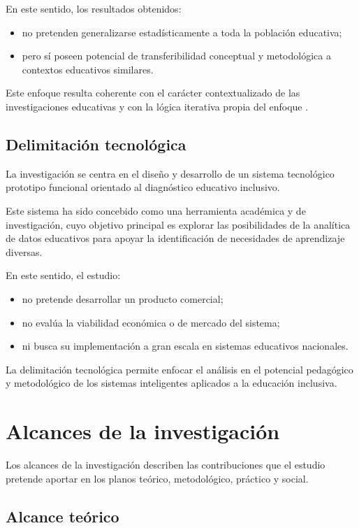 \begin{refsection}
En este sentido, los resultados obtenidos:

\begin{itemize}
\item no pretenden generalizarse estadísticamente a toda la población educativa;
\item pero sí poseen potencial de transferibilidad conceptual y metodológica a contextos educativos similares.
\end{itemize}

Este enfoque resulta coherente con el carácter contextualizado de las investigaciones educativas y con la lógica iterativa propia del enfoque \DBR.

\subsection{Delimitación tecnológica}

La investigación se centra en el diseño y desarrollo de un sistema tecnológico prototipo funcional orientado al diagnóstico educativo inclusivo.

Este sistema ha sido concebido como una herramienta académica y de investigación, cuyo objetivo principal es explorar las posibilidades de la analítica de datos educativos para apoyar la identificación de necesidades de aprendizaje diversas.

En este sentido, el estudio:

\begin{itemize}
\item no pretende desarrollar un producto comercial;
\item no evalúa la viabilidad económica o de mercado del sistema;
\item ni busca su implementación a gran escala en sistemas educativos nacionales.
\end{itemize}

La delimitación tecnológica permite enfocar el análisis en el potencial pedagógico y metodológico de los sistemas inteligentes aplicados a la educación inclusiva.

\section{Alcances de la investigación}

Los alcances de la investigación describen las contribuciones que el estudio pretende aportar en los planos teórico, metodológico, práctico y social.

\subsection{Alcance teórico}


\end{refsection}

